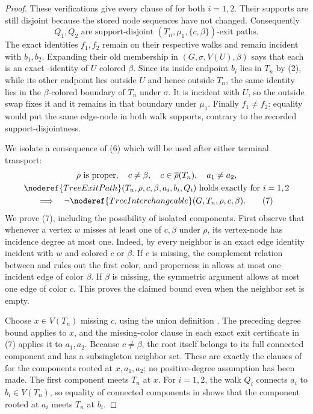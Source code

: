 \begin{proof}
These verifications give every clause of  for
both \(i=1,2\).  Their supports are still disjoint because the stored
node sequences have not changed.  Consequently
\[
 Q_1,Q_2\text{ are support-disjoint }
       (T_n,\mu_1,\{c,\beta\})\text{-exit paths}.             \tag{6}
\]
The exact identities \(f_1,f_2\) remain on their respective walks and
remain incident with \(b_1,b_2\).  Expanding their old membership in
\((G,\sigma,V(U),\beta)\) says that each is
an exact -identity of \(U\) colored \(\beta\).
Since its inside endpoint \(b_i\) lies in \(T_n\) by (2), while its
other endpoint lies outside \(U\) and hence outside \(T_n\), the same
identity lies in the \(\beta\)-colored boundary of \(T_n\) under
\(\sigma\).  It is incident with \(U\), so the outside swap fixes it and
it remains in that boundary under \(\mu_1\).  Finally \(f_1\ne f_2\):
equality would put the same edge-node in both walk supports, contrary to
the recorded support-disjointness.

We isolate a consequence of (6) which will be used after either terminal
transport:
\[
 \begin{gathered}
 \rho\text{ is proper},\quad c\ne\beta,\quad
 c\in\overline\rho(T_n),\quad a_1\ne a_2,\\
 \noderef{TreeExitPath}(T_n,\rho,c,\beta,a_i,b_i,Q_i)
 \text{ holds exactly for }i=1,2\\
 \Longrightarrow\quad
 \neg\noderef{TreeInterchangeable}(G,T_n,\rho,c,\beta).
                                                               \tag{7}
 \end{gathered}
\]
We prove (7), including the possibility of isolated components.  First
observe that whenever a vertex \(w\) misses at least one of \(c,\beta\)
under \(\rho\), its vertex-node has incidence degree at most one.  Indeed,
by  every neighbor is an exact edge
identity incident with \(w\) and colored \(c\) or \(\beta\).  If \(c\)
is missing, the complement relation between  and
 rules out the first color, and properness in
 allows at most one incident edge of color
\(\beta\).  If \(\beta\) is missing, the symmetric argument allows at
most one edge of color \(c\).  This proves the claimed bound even when
the neighbor set is empty.

Choose \(x\in V(T_n)\) missing \(c\), using the union definition
.  The preceding degree bound applies to
\(x\), and the missing-color clause in each exact exit certificate in
(7) applies it to \(a_1,a_2\).  Because \(c\ne\beta\), the root itself
belongs to its full connected component and has a subsingleton neighbor
set.  These are exactly the clauses of
 for the components rooted at
\(x,a_1,a_2\); no positive-degree assumption has been made.  The first
component meets \(T_n\) at \(x\).  For \(i=1,2\), the walk \(Q_i\)
connects \(a_i\) to \(b_i\in V(T_n)\), so equality of connected
components in  shows that the component rooted
at \(a_i\) meets \(T_n\) at \(b_i\).


\end{proof}
